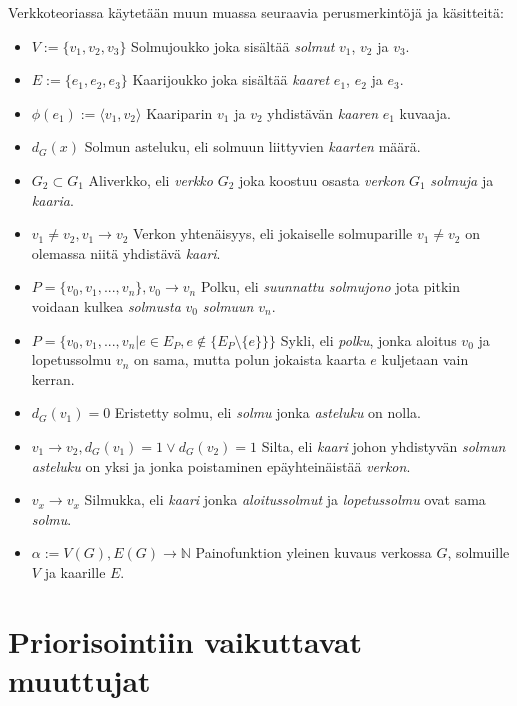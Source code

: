   Verkkoteoriassa käytetään muun muassa seuraavia perusmerkintöjä ja käsitteitä:

  \begin{itemize}
    \item \(V := \{v_1, v_2, v_3\}\) Solmujoukko joka sisältää \emph{solmut} \(v_1\), \(v_2\) ja \(v_3\).
    \item \(E := \{e_1, e_2, e_3\}\) Kaarijoukko joka sisältää \emph{kaaret} \(e_1\), \(e_2\) ja \(e_3\).
    \item \(\phi(e_1) := \langle v_1, v_2 \rangle\) Kaariparin \(v_1\) ja \(v_2\) yhdistävän \emph{kaaren} \(e_1\) kuvaaja.
    \item \(d_G(x)\) Solmun asteluku, eli solmuun liittyvien \emph{kaarten} määrä.
    \item \(G_2 \subset G_1\) Aliverkko, eli \emph{verkko} \(G_2\) joka koostuu osasta \emph{verkon} \(G_1\) \emph{solmuja} ja \emph{kaaria}.
    \item \(v_1 \neq v_2, v_1 \rightarrow v_2\) Verkon yhtenäisyys, eli jokaiselle solmuparille \(v_1 \neq v_2\) on olemassa niitä yhdistävä \emph{kaari}.
    \item \(P = \{v_0, v_1, ..., v_n\}, v_0 \rightarrow v_n\) Polku, eli \emph{suunnattu solmujono} jota pitkin voidaan kulkea \emph{solmusta} \(v_0\) \emph{solmuun} \(v_n\).
    \item \(P = \{v_0, v_1, ..., v_n| e \in E_P, e \notin \{E_P \setminus \{e\} \}\}\) Sykli, eli \emph{polku}, jonka aloitus \(v_0\) ja lopetussolmu \(v_n\) on sama, mutta polun jokaista kaarta \(e\) kuljetaan vain kerran.
    \item \(d_G(v_1) = 0\) Eristetty solmu, eli \emph{solmu} jonka \emph{asteluku} on nolla.
    \item \(v_1 \rightarrow v_2, d_G(v_1) = 1 \lor d_G(v_2) = 1\) Silta, eli \emph{kaari} johon yhdistyvän \emph{solmun asteluku} on yksi ja jonka poistaminen epäyhteinäistää \emph{verkon}.
    \item \(v_x \rightarrow v_x\) Silmukka, eli \emph{kaari} jonka \emph{aloitussolmut} ja \emph{lopetussolmu} ovat sama \emph{solmu}.
    \item \(\alpha := V(G), E(G) \rightarrow \mathbb{N}\) Painofunktion yleinen kuvaus verkossa \(G\), solmuille \(V\) ja kaarille \(E\).
  \end{itemize}

\section{Priorisointiin vaikuttavat muuttujat} \label{ch:10_priorisointiin_vaikuttavat_muuttujat}

